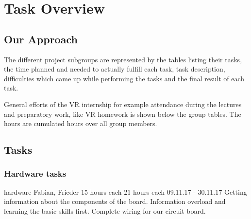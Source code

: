 \section{Task Overview}

\subsection{Our Approach}

The different project subgroups are represented by the tables listing their tasks, the time planned and needed to actually fulfill each task, task description, difficulties which came up while performing the tasks and the final result of each task.

General efforts of the VR internship for example attendance during the lectures and preparatory work, like VR homework is shown below the group tables. The hours are cumulated hours over all group members.

\subsection{Tasks}


\subsubsection{Hardware tasks}
	{hardware}%
	{Fabian, Frieder}%
	{15 hours each}%
	{21 hours each}%
	{09.11.17 - 30.11.17}%
	{Getting information about the components of the board.}%
	{Information overload and learning the basic skills first.}%
	{Complete wiring for our circuit board.}%

